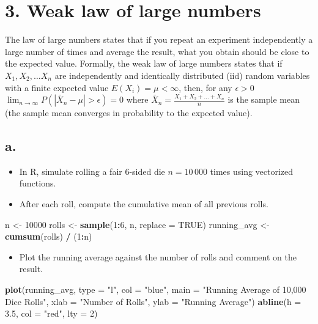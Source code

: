 \documentclass[
]{article}
\newenvironment{Shaded}{\begin{snugshade}}{\end{snugshade}}
\newcommand{\AttributeTok}[1]{\textcolor[rgb]{0.13,0.29,0.53}{#1}}
\newcommand{\ConstantTok}[1]{\textcolor[rgb]{0.56,0.35,0.01}{#1}}
\newcommand{\DecValTok}[1]{\textcolor[rgb]{0.00,0.00,0.81}{#1}}
\newcommand{\FloatTok}[1]{\textcolor[rgb]{0.00,0.00,0.81}{#1}}
\newcommand{\FunctionTok}[1]{\textcolor[rgb]{0.13,0.29,0.53}{\textbf{#1}}}
\newcommand{\NormalTok}[1]{#1}
\newcommand{\OtherTok}[1]{\textcolor[rgb]{0.56,0.35,0.01}{#1}}
\newcommand{\SpecialCharTok}[1]{\textcolor[rgb]{0.81,0.36,0.00}{\textbf{#1}}}
\newcommand{\StringTok}[1]{\textcolor[rgb]{0.31,0.60,0.02}{#1}}
\providecommand{\tightlist}{%
  \setlength{\itemsep}{0pt}\setlength{\parskip}{0pt}}
\begin{document}
\section{3. Weak law of large numbers}\label{weak-law-of-large-numbers}

The law of large numbers states that if you repeat an experiment
independently a large number of times and average the result, what you
obtain should be close to the expected value. Formally, the weak law of
large numbers states that if \(X_1, X_2, \ldots X_n\) are independently
and identically distributed (iid) random variables with a finite
expected value \(E(X_i)=\mu<\infty\), then, for any \(\epsilon > 0\)
\(\lim_{n\rightarrow \infty} P(|\bar X_n-\mu|>\epsilon)=0\) where
\(\bar X_n=\frac{X_1+X_2+\ldots+X_n}{n}\) is the sample mean (the sample
mean converges in probability to the expected value).

\subsection{a.}\label{a.-2}

\begin{itemize}
\tightlist
\item
  In R, simulate rolling a fair 6-sided die \(n=10\,000\) times using
  vectorized functions.
\item
  After each roll, compute the cumulative mean of all previous rolls.
\end{itemize}

\begin{Shaded}
\begin{Highlighting}[]
\NormalTok{n }\OtherTok{\textless{}{-}} \DecValTok{10000}
\NormalTok{rolls }\OtherTok{\textless{}{-}} \FunctionTok{sample}\NormalTok{(}\DecValTok{1}\SpecialCharTok{:}\DecValTok{6}\NormalTok{, n, }\AttributeTok{replace =} \ConstantTok{TRUE}\NormalTok{)}
\NormalTok{running\_avg }\OtherTok{\textless{}{-}} \FunctionTok{cumsum}\NormalTok{(rolls) }\SpecialCharTok{/}\NormalTok{ (}\DecValTok{1}\SpecialCharTok{:}\NormalTok{n)}
\end{Highlighting}
\end{Shaded}

\begin{itemize}
\tightlist
\item
  Plot the running average against the number of rolls and comment on
  the result.
\end{itemize}

\begin{Shaded}
\begin{Highlighting}[]
\FunctionTok{plot}\NormalTok{(running\_avg, }\AttributeTok{type =} \StringTok{"l"}\NormalTok{, }\AttributeTok{col =} \StringTok{"blue"}\NormalTok{,}
     \AttributeTok{main =} \StringTok{"Running Average of 10,000 Dice Rolls"}\NormalTok{,}
     \AttributeTok{xlab =} \StringTok{"Number of Rolls"}\NormalTok{, }\AttributeTok{ylab =} \StringTok{"Running Average"}\NormalTok{)}
\FunctionTok{abline}\NormalTok{(}\AttributeTok{h =} \FloatTok{3.5}\NormalTok{, }\AttributeTok{col =} \StringTok{"red"}\NormalTok{, }\AttributeTok{lty =} \DecValTok{2}\NormalTok{)}
\end{Highlighting}
\end{Shaded}
\end{document}
